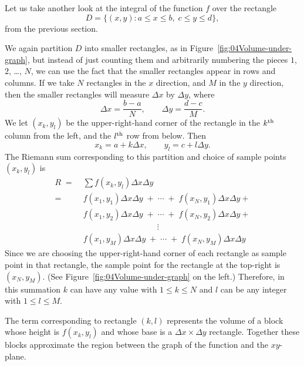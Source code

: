 Let us take another look at the integral of the function $f$ over the
rectangle
\[
D = \bigl\{(x,y) : a\leq x\leq b, \; c\leq y\leq d\bigr\},
\]
from the previous section.  

We again partition $D$ into smaller rectangles, as in
Figure~\ref{fig:04Volume-under-graph}, but instead of just counting them and
arbitrarily numbering the pieces $1$, $2$, \ldots, $N$, we can use the fact that the
smaller rectangles appear in rows and columns.  If we take $N$ rectangles in the $x$
direction, and $M$ in the $y$ direction, then the smaller rectangles will measure
$\Delta x$ by $\Delta y$, where
\[
\Delta x = \frac{b-a}{N}, \qquad \Delta y = \frac{d-c}{M}.
\]
We let $(x_k, y_l)$ be the upper-right-hand corner of the rectangle in
the $k^{\rm th}$ column from the left, and the $l^{\rm th}$ row from
below.  Then
\begin{equation}
  x_k = a+k \Delta x, \qquad y_l = c+ l \Delta y.
  \label{eq:04xkyl-defined}
\end{equation}
The Riemann sum corresponding to this partition and choice of sample points
$(x_k, y_l)$ is
\begin{equation}
\label{eq:04Doubleint-Riemannsum}
\begin{aligned}
  R\;
  =\;& \sum f(x_k, y_l) \Delta x \Delta y \\  
  =\;& f(x_1, y_1) \Delta x \Delta y \;+\; \cdots \;+\;f(x_{N}, y_1)\Delta x\Delta y +\\
    &f(x_1, y_2) \Delta x \Delta y \;+\; \cdots \;+\;f(x_{N}, y_2)\Delta x \Delta y + \\[-3pt]
    &\hspace{9em}\vdots\\
    &f(x_1, y_{M}) \Delta x \Delta y \;+\; \cdots \;+\;f(x_{N}, y_{M})\Delta x \Delta y
\end{aligned}
\end{equation}
Since we are choosing the upper-right-hand corner of each rectangle as
sample point in that rectangle, the sample point for the rectangle at
the top-right is $(x_{N}, y_{M})$.  (See
Figure~\ref{fig:04Volume-under-graph} on the left.) Therefore, in this
summation $k$ can have any value with $1\le k\le N$ and $l$ can be any
integer with $1\le l\le M$.  


The term corresponding to rectangle $(k,l)$ represents the volume of a
block whose height is $f(x_k, y_l)$ and whose base is a $\Delta
x\times \Delta y$ rectangle.  Together these blocks approximate the
region between the graph of the function and the $xy$-plane.

